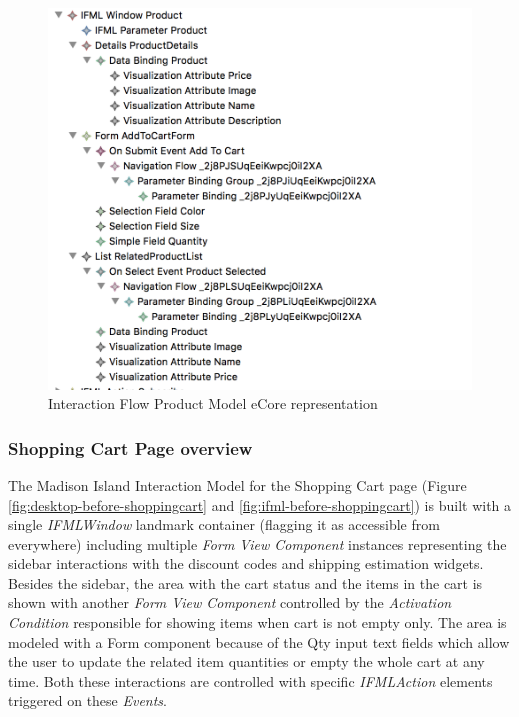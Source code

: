 \vspace{0.5cm}
\begin{figure}[H]
  \centering
    \includegraphics[width=13cm]{images/diagrams/before/ifml-hierarchy-product.png}
  \caption{Interaction Flow Product Model eCore representation}
  \label{fig:ifml-before-hierarchy-product}
\end{figure}
\vspace{0.5cm}

\subsubsection{Shopping Cart Page overview}

The Madison Island Interaction Model for the Shopping Cart page (Figure \ref{fig:desktop-before-shoppingcart} and \ref{fig:ifml-before-shoppingcart}) is  built with a single \textit{IFMLWindow} landmark container (flagging it as accessible from everywhere) including multiple \textit{Form View Component} instances representing the sidebar interactions with the discount codes and shipping estimation widgets. Besides the sidebar, the area with the cart status and the items in the cart is shown with another \textit{Form View Component} controlled by the \textit{Activation Condition} responsible for showing items when cart is not empty only. The area is modeled with a Form component because of the Qty input text fields which allow the user to update the related item quantities or empty the whole cart at any time. Both these interactions are controlled with specific \textit{IFMLAction} elements triggered on these \textit{Events}.

